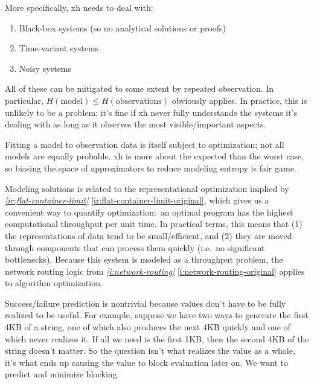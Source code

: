 \documentclass{report}
\newcommand{\refboth}[1]{{\em \ref{#1}} \ref{#1-original}}
\begin{document}
  More specifically, xh needs to deal with:

\begin{enumerate}
\item{Black-box systems (so no analytical solutions or proofs)}
\item{Time-variant systems}
\item{Noisy systems}
\end{enumerate}

  All of these can be mitigated to some extent by repeated observation. In
  particular, $H(\textrm{model}) \le H(\textrm{observations})$ obviously
  applies. In practice, this is unlikely to be a problem; it's fine if xh never
  fully understands the systems it's dealing with as long as it observes the
  most visible/important aspects.

  Fitting a model to observation data is itself subject to optimization; not
  all models are equally probable. xh is more about the expected than the worst
  case, so biasing the space of approximators to reduce modeling entropy is
  fair game.

  Modeling solutions is related to the representational optimization implied by
  \refboth{ir:flat-container-limit}, which gives us a convenient way to
  quantify optimization:~an optimal program has the highest computational
  throughput per unit time. In practical terms, this means that (1) the
  representations of data tend to be small/efficient, and (2) they are moved
  through components that can process them quickly (i.e.~no significant
  bottlenecks). Because this system is modeled as a throughput problem, the
  network routing logic from \refboth{i:network-routing} applies to algorithm
  optimization.

  Success/failure prediction is nontrivial because values don't have to be
  fully realized to be useful. For example, suppose we have two ways to
  generate the first 4KB of a string, one of which also produces the next 4KB
  quickly and one of which never realizes it. If all we need is the first 1KB,
  then the second 4KB of the string doesn't matter. So the question isn't what
  realizes the value as a whole, it's what ends up causing the value to block
  evaluation later on. We want to predict and minimize blocking.
\end{document}
